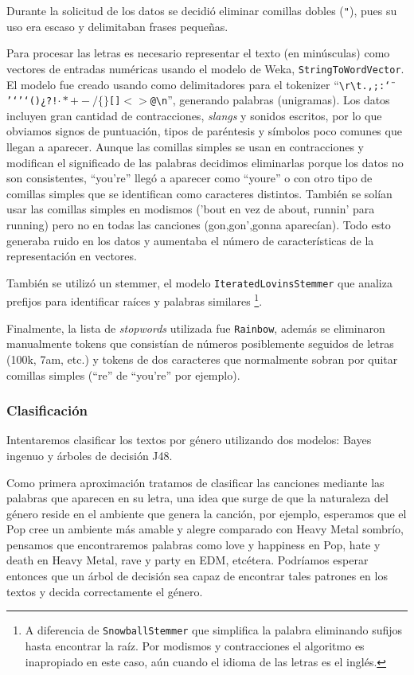 \documentclass[spanish,11pt,letterpaper]{article}
\begin{document}
Durante la solicitud de los datos se decidió eliminar comillas dobles (\texttt{"}),
pues su uso era escaso y delimitaban frases pequeñas.

Para procesar las letras
es necesario representar el texto (en minúsculas) como vectores de entradas numéricas usando
el modelo de Weka, \texttt{StringToWordVector}. El modelo fue creado usando como
delimitadores para el tokenizer
``\texttt{\textvisiblespace\textbackslash r\textbackslash t.,;:\char`\"}%
\texttt{'‘’`()¿?!$\cdot*+-/\{\}$[]$<>$@\textbackslash n}'', generando palabras (unigramas).
Los datos incluyen gran cantidad de contracciones, \textit{slangs} y sonidos escritos, por
lo que obviamos signos de puntuación, tipos de paréntesis y símbolos poco comunes
que llegan a aparecer. Aunque las comillas simples se usan en contracciones y
modifican el significado de las palabras decidimos eliminarlas porque los datos
no son consistentes, ``you're'' llegó a aparecer como ``you\textvisiblespace re''
o con otro tipo de comillas simples que se identifican como caracteres distintos.
También se solían usar las comillas simples en modismos ('bout
en vez de about, runnin' para running) pero no en todas las canciones (gon,gon',gonna
aparecían). Todo esto generaba ruido en los datos y aumentaba el número de
características de la representación en vectores.

También se utilizó un stemmer, el modelo \texttt{IteratedLovinsStemmer} que analiza
prefijos para identificar raíces y palabras similares%
\footnote{A diferencia de \texttt{SnowballStemmer} que simplifica
la palabra eliminando sufijos hasta encontrar la raíz. Por modismos
y contracciones el algoritmo es inapropiado en este caso, aún cuando el idioma
de las letras es el inglés.}.

Finalmente, la lista de \textit{stopwords} utilizada fue \texttt{Rainbow}, además
se eliminaron manualmente tokens que consistían de números posiblemente seguidos de letras
(100k, 7am, etc.) y tokens de dos caracteres que normalmente sobran por quitar
comillas simples (``re'' de ``you're'' por ejemplo).

\subsubsection{Clasificación}

Intentaremos clasificar los textos por género utilizando dos modelos: Bayes ingenuo
y árboles de decisión J48.

Como primera aproximación tratamos de clasificar las canciones mediante las
palabras que aparecen en su letra, una idea que surge de que la
naturaleza del género reside en el ambiente que genera la canción, por ejemplo,
esperamos que el Pop cree un ambiente más amable y alegre comparado con Heavy
Metal sombrío, pensamos que encontraremos palabras como love y happiness en Pop,
hate y death en Heavy Metal, rave y party en EDM, etcétera. Podríamos esperar
entonces que un árbol de decisión sea capaz de encontrar tales patrones en los
textos y decida correctamente el género.
\end{document}

